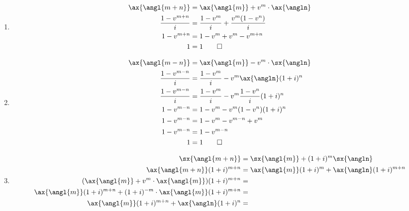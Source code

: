 \documentclass[a4paper, 12pt, reqno]{amsart}
\numberwithin{equation}{section}
\begin{document}
\begin{enumerate}[label=(\alph*)]
    \item 
        \begin{equation}\nonumber
            \begin{aligned}
                \ax{\angl{m+n}} &= \ax{\angl{m}} + v^m \cdot \ax{\angln}  \\
                \frac{1-v^{m+n}}{i} &= \frac{1-v^m}{i} + \frac{v^m(1-v^n)}{i}\\
                1 - v^{m+n} &= 1 - v^m + v^m - v^{m+n}  \\
                1 &= 1      \qed
            \end{aligned}
        \end{equation}
    \item 
        \begin{equation}\nonumber
            \begin{aligned}
                \ax{\angl{m-n}} &= \ax{\angl{m}} - v^m \cdot \sx{\angln}    \\
                \frac{1-v^{m-n}}{i} &= \frac{1-v^m}{i} - v^m\ax{\angln}(1+i)^n\\
                \frac{1-v^{m-n}}{i} &= \frac{1-v^m}{i} 
                    - v^m\frac{1-v^n}{i}(1+i)^n\\
                1-v^{m-n} &= 1-v^m - v^m(1-v^n)(1+i)^n  \\
                1-v^{m-n} &= 1 - v^m - v^{m-n} + v^m    \\
                1 - v^{m-n} &= 1 - v^{m-n}  \\
                1 &= 1      \qed
            \end{aligned}
        \end{equation}
    \item 
        \begin{equation}\nonumber
            \begin{aligned}
                \sx{\angl{m+n}} &= \sx{\angl{m}} + (1+i)^m\sx{\angln}   \\
                \ax{\angl{m+n}}(1+i)^{m+n} &= \ax{\angl{m}}(1+i)^m
                    + \ax{\angln}(1+i)^{m+n}                            \\
                (\ax{\angl{m}} + v^m \cdot \ax{\angl{m}})(1+i)^{m+n} &= \\
                \ax{\angl{m}}(1+i)^{m+n} + (1+i)^{-m} \cdot \ax{\angl{m}} 
                    (1+i)^{m+n} &=                                      \\
                \ax{\angl{m}}(1+i)^{m+n} + \ax{\angln}(1+i)^n &= 

\end{aligned}
\end{equation}
\end{enumerate}
\end{document}
